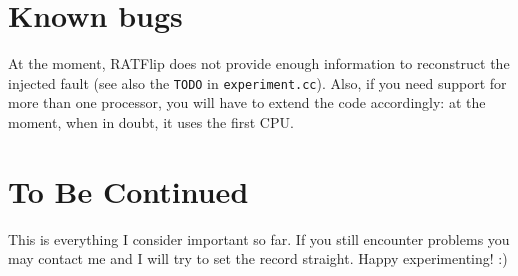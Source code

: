 \documentclass[a4paper,10pt]{article}
\begin{document}
\section{Known bugs}

At the moment, RATFlip does not provide enough information
to reconstruct the injected fault
(see also the \texttt{TODO} in \texttt{experiment.cc}).
Also, if you need support for more than one processor,
you will have to extend the code accordingly:
at the moment, when in doubt, it uses the first CPU.

\section{To Be Continued}

This is everything I consider important so far. If you still encounter
problems you may
contact me and I will try to set the record straight.
Happy experimenting! :)
\end{document}
